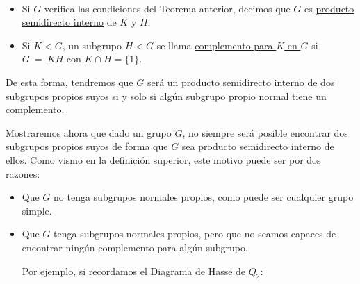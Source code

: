 \begin{definicion}\ 
    \begin{itemize}
        \item Si $G$ verifica las condiciones del Teorema anterior, decimos que $G$ es \underline{producto} \underline{semidirecto interno} de $K$ y $H$.
        \item Si $K < G$, un subgrupo $H<G$ se llama \underline{complemento para $K$ en $G$} si $G~=~KH$ con $K\cap H = \{1\}$.
    \end{itemize}
    De esta forma, tendremos que $G$ será un producto semidirecto interno de dos subgrupos propios suyos si y solo si algún subgrupo propio normal tiene un complemento.
\end{definicion}

\begin{ejemplo}
    Mostraremos ahora que dado un grupo $G$, no siempre será posible encontrar dos subgrupos propios suyos de forma que $G$ sea producto semidirecto interno de ellos. Como vismo en la definición superior, este motivo puede ser por dos razones:
    \begin{itemize}
        \item Que $G$ no tenga subgrupos normales propios, como puede ser cualquier grupo simple.
        \item Que $G$ tenga subgrupos normales propios, pero que no seamos capaces de encontrar ningún complemento para algún subgrupo.

            Por ejemplo, si recordamos el Diagrama de Hasse de $Q_2$:
            \begin{figure}[H]
                \centering
\end{figure}
\end{itemize}
\end{ejemplo}
